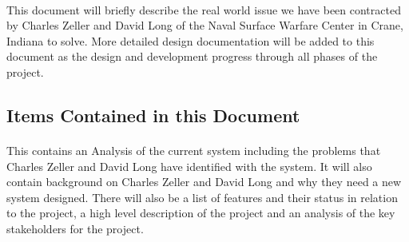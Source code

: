 \paragraph{} This document will briefly describe the real world issue we have been contracted by Charles Zeller and David Long of the Naval Surface Warfare Center in Crane, Indiana to solve. More detailed design documentation will be added to this document as the design and development progress through all phases of the project.

\subsection*{Items Contained in this Document}
\paragraph{}This contains an Analysis of the current system including the problems that Charles Zeller and David Long have identified with the system. It will also contain background on Charles Zeller and David Long and why they need a new system designed. There will also be a list of features and their status in relation to the project, a high level description of the project and an analysis of the key stakeholders for the project. %